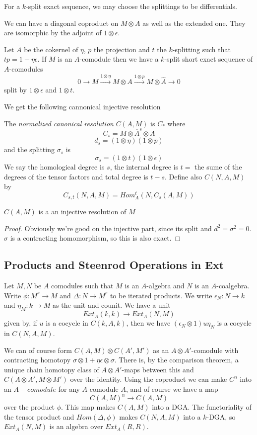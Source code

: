 For a $k$-split exact sequence, we may choose the splittings to be differentials.  

We can have a diagonal coproduct on $M\otimes A$ as well as the extended one.  They are isomorphic by the adjoint of $1\otimes \epsilon$. 

Let $\overline{A}$ be the cokernel of $\eta$, $p$ the projection and $t$ the $k$-splitting such that $tp=1-\eta\epsilon$.  
If $M$ is an $A$-comodule then we have a $k$-split short exact sequence of $A$-comodules 
\[0\to M\xrightarrow{1\otimes\eta} M\otimes A\xrightarrow{1\otimes p} M\otimes \hat{A}\to 0\]
split by $1\otimes \epsilon$ and $1\otimes t$.  

We get the following cannonical injective resolution

\begin{Def}
  The \emph{normalized canonical resolution} $C(A,M)$ is $C_*$ where
  \[C_s=M\otimes \overline{A}^s\otimes A\]
  \[d_s=(1\otimes\eta)(1\otimes p)\]
  and the splitting $\sigma_s$ is
  \[\sigma_s=(1\otimes t)(1\otimes \epsilon)\]
  We say the homological degree is $s$, the internal degree is $t=$ the sume of the degrees of the tensor factors and total degree is $t-s$.  
  Define also $C(N,A,M)$ by 
  \[C_{s,t}(N,A,M)=Hom_A^t(N,C_s(A,M))\]
\end{Def}

\begin{Theorem}
  $C(A,M)$ is a an injective resolution of $M$
\end{Theorem}

\begin{proof}
  Obviously we're good on the injective part, since its split and $d^2=\sigma^2=0$.  
  $\sigma$ is a contracting homomorphism, so this is also exact.
\end{proof}

\subsection{Products and Steenrod Operations in Ext}

Let $M,N$ be $A$ comodules such that $M$ is an $A$-algebra and $N$ is an $A$-coalgebra.
Write $\phi:M^r\to M$ and $\Delta:N\to M^r$ to be iterated products.  
We write $\epsilon_N:N\to k$ and $\eta_M:k\to M$ as the unit and counit.  
We have a unit 
\[Ext_A(k,k)\to Ext_A(N,M)\]
given by, if $u$ is a cocycle in $C(k,A,k)$, then we have $(\epsilon_N\otimes 1)u\eta_N$ is a cocycle in $C(N,A,M)$.  

We can of course form $C(A,M)\otimes C(A',M')$ as an $A\otimes A'$-comodule with contracting homotopy $\sigma\otimes1+\eta\epsilon\otimes\sigma$.  
There is, by the comparison theorem, a unique chain homotopy class of $A\otimes A'$-maps between this and $C(A\otimes A',M\otimes M')$ over the identity.
Using the coproduct we can make $C^n$ into an $A-comodule$ for any $A$-comodule $A$, and of course we have a map
\[C(A,M)^n\to C(A,M)\]
over the product $\phi$.  This map makes $C(A,M)$ into a DGA.  The functoriality of the tensor product and $Hom(\Delta,\phi)$ makes $C(N,A,M)$ into a $k$-DGA, so $Ext_A(N,M)$ is an algebra over $Ext_A(R,R)$.  

